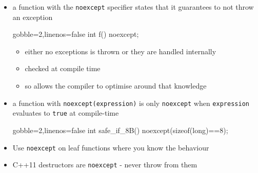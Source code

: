 \begin{frame}[fragile]
  \begin{block}{}
    \begin{itemize}
      \item a function with the \texttt{noexcept} specifier states that it guarantees to not throw an exception
      \begin{cppcode*}{gobble=2,linenos=false}
        int f() noexcept;
      \end{cppcode*}
      \begin{itemize}
        \item either no exceptions is thrown or they are handled internally
        \item checked at compile time
        \item so allows the compiler to optimise around that knowledge
      \end{itemize}
      \item a function with \texttt{noexcept(expression)} is only \texttt{noexcept} when \texttt{expression} evaluates to \texttt{true} at compile-time
      \begin{cppcode*}{gobble=2,linenos=false}
        int safe_if_8B() noexcept(sizeof(long)==8);
      \end{cppcode*}
      \item Use \texttt{noexcept} on leaf functions where you know the behaviour
      \item C++11 destructors are \texttt{noexcept} - never throw from them
    \end{itemize}
  \end{block}
\end{frame}

